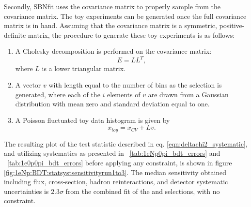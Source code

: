Secondly, SBNfit uses the covariance matrix to properly sample from the covariance matrix.
The toy experiments can be generated once the full covariance matrix is in hand. Assuming that the covariance matrix is a symmetric, positive-definite matrix, the procedure to generate these toy experiments is as follows:
\begin{enumerate}
    \item A Cholesky decomposition \cite{bib:cholesky} is performed on the covariance matrix: $$E = LL^{T},$$
    where $L$ is a lower triangular matrix.
    \item A vector $v$ with length equal to the number of bins as the selection is generated, where each of the $i$ elements of $v$ are drawn from a Gaussian distribution with mean zero and standard deviation equal to one.
    \item A Poisson fluctuated toy data histogram is given by
$$x_{toy} = x_{CV} + Lv.$$
\end{enumerate}

The resulting plot of the test statistic described in eq. \ref{eqn:deltachi2_systematic}, and utilizing systematics as presented in ~\cref{tab:1eNp0pi_bdt_errors} and ~\cref{tab:1e0p0pi_bdt_errors} before applying any constraint, is shown in figure \ref{fig:1eNp:BDT:statsystsensitivityrun1to3}. 
The median sensitivity obtained including flux, cross-section, hadron reinteractions, and detector systematic uncertainties is $2.3\sigma$ from the combined fit of the \npsel and \zpsel selections, with no \numu constraint.

